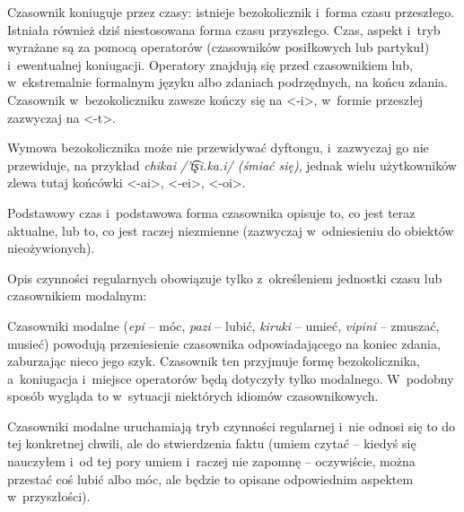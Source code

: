 \begin{spacing}{1.1}
Czasownik koniuguje przez czasy: istnieje bezokolicznik i~forma czasu 
przeszłego. Istniała również dziś niestosowana forma czasu przyszłego. Czas, 
aspekt i~tryb wyrażane są za pomocą operatorów (czasowników posiłkowych lub 
partykuł) i~ewentualnej koniugacji. Operatory znajdują się przed czasownikiem 
lub, w~ekstremalnie formalnym języku albo zdaniach podrzędnych, na końcu zdania.
 Czasownik w~bezokoliczniku zawsze kończy się na <-i>, w~formie przeszłej
  zazwyczaj na <-t>.

Wymowa bezokolicznika może nie przewidywać dyftongu, i~zazwyczaj go nie przewiduje,
na przykład \emph{chikai /'t͡ʂi.ka.i/ (śmiać się)}, jednak wielu użytkowników 
zlewa tutaj końcówki <-ai>, <-ei>, <-oi>.

\skipline

Podstawowy czas i~podstawowa forma czasownika opisuje to, co jest teraz 
aktualne, lub to, co jest raczej niezmienne (zazwyczaj w~odniesieniu do 
obiektów nieożywionych).


Opis czynności regularnych obowiązuje tylko z~określeniem jednostki czasu lub
 czasownikiem modalnym:




Czasowniki modalne (\emph{epi} -- móc, \emph{pazi} -- lubić, \emph{kiruki} -- 
umieć, \emph{vipini} -- zmuszać, musieć) powodują przeniesienie czasownika 
odpowiadającego na koniec zdania, zaburzając nieco jego szyk. Czasownik ten 
przyjmuje formę bezokolicznika, a~koniugacja i~miejsce operatorów będą dotyczyły
tylko modalnego. W~podobny sposób wygląda to w~sytuacji niektórych idiomów 
czasownikowych.



Czasowniki modalne uruchamiają tryb czynności regularnej i~nie odnosi się to do 
tej konkretnej chwili, ale do stwierdzenia faktu (umiem czytać -- kiedyś się 
nauczyłem i~od tej pory umiem i~raczej nie zapomnę -- oczywiście, można przestać
coś lubić albo móc, ale będzie to opisane odpowiednim aspektem w~przyszłości).


\end{spacing}
